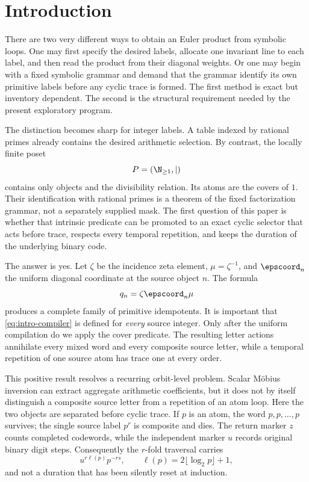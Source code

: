 \section{Introduction}
\label{sec:introduction}

There are two very different ways to obtain an Euler product from symbolic
loops. One may first specify the desired labels, allocate one invariant line
to each label, and then read the product from their diagonal weights. Or one
may begin with a fixed symbolic grammar and demand that the grammar identify
its own primitive labels before any cyclic trace is formed. The first method
is exact but inventory dependent. The second is the structural requirement
needed by the present exploratory program.

The distinction becomes sharp for integer labels. A table indexed by
rational primes already contains the desired arithmetic selection. By
contrast, the locally finite poset
\[
P=(\N_{\ge1},\mid)
\]
contains only objects and the divisibility relation. Its atoms are the covers
of \(1\). Their identification with rational primes is a theorem of the fixed
factorization grammar, not a separately supplied mask. The first question of
this paper is whether that intrinsic predicate can be promoted to an exact
cyclic selector that acts before trace, respects every temporal repetition,
and keeps the duration of the underlying binary code.

The answer is yes. Let \(\zeta\) be the incidence zeta element,
\(\mu=\zeta^{-1}\), and \(\epscoord_n\) the uniform diagonal coordinate at
the source object \(n\). The formula
\begin{equation}
q_n=\zeta\epscoord_n\mu
\label{eq:intro-compiler}
\end{equation}
produces a complete family of primitive idempotents. It is important that
\eqref{eq:intro-compiler} is defined for \emph{every} source integer. Only
after the uniform compilation do we apply the cover predicate. The resulting
letter actions annihilate every mixed word and every composite source letter,
while a temporal repetition of one source atom has trace one at every order.

This positive result resolves a recurring orbit-level problem. Scalar Möbius
inversion can extract aggregate arithmetic coefficients, but it does not by
itself distinguish a composite source letter from a repetition of an atom
loop. Here the two objects are separated before cyclic trace. If \(p\) is an
atom, the word \(p,p,\ldots,p\) survives; the single source label \(p^r\) is
composite and dies. The return marker \(z\) counts completed codewords, while
the independent marker \(u\) records original binary digit steps.
Consequently the \(r\)-fold traversal carries
\[
u^{r\ell(p)}p^{-rs},
\qquad
\ell(p)=2\lfloor\log_2p\rfloor+1,
\]
and not a duration that has been silently reset at induction.

